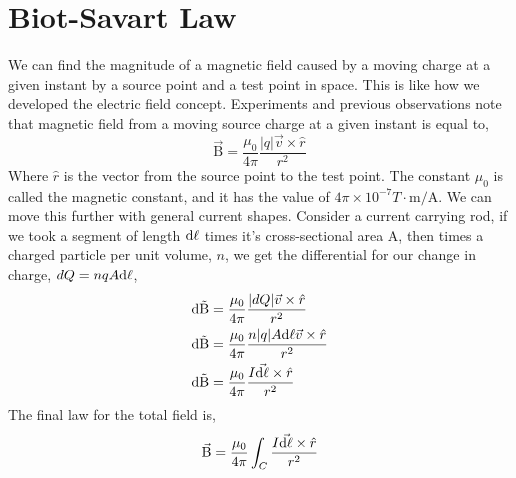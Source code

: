 \section{Biot-Savart Law}
We can find the magnitude of a magnetic field caused by a moving charge at a given instant by a source point and a test point in space. This is like how we developed the electric field concept. Experiments and previous observations note that magnetic field from a moving source charge at a given instant is equal to, 
\begin{equation*}
	\vec{\mathrm{B}} = \frac{\mu_0}{4\pi} \frac{|q|\vec{v} \times \hat{r}}{r^2} 
\end{equation*}
Where $\hat{r}$ is the vector from the source point to the test point. The constant $\mu_0$ is called the magnetic constant, and it has the value of $4\pi \times 10^{-7} T \cdot \mathrm{m} / \mathrm{A}$. We can move this further with general current shapes. Consider a current carrying rod, if we took a segment of length $\mathrm{\mathrm{d}\ell}$ times it's cross-sectional area $\mathrm{A}$, then times a charged particle per unit volume, $n$, we get the differential for our change in charge, $dQ = nqA\mathrm{\mathrm{d}\ell}$, 
\begin{align*}
	\mathrm{\mathrm{d}\vec{B}} &= \frac{\mu_0}{4\pi} \frac{|dQ|\vec{v} \times \hat{r}}{r^2} \\ 
	\mathrm{\mathrm{d}\vec{B}} &= \frac{\mu_0}{4\pi} \frac{n|q|A\mathrm{\mathrm{d}\ell}\vec{v}\times\hat{r}}{r^2} \\ 
	\mathrm{\mathrm{d}\vec{B}} &= \frac{\mu_0}{4\pi} \frac{I\vec{\mathrm{\mathrm{d}\ell}} \times \hat{r}}{r^2} 
\end{align*}
The final law for the total field is,
\begin{equation*}
	\vec{\mathrm{B}} = \frac{\mu_0}{4\pi} \int_C \frac{I\vec{\mathrm{\mathrm{d}\ell}} \times \hat{r}}{r^2} 
\end{equation*}





